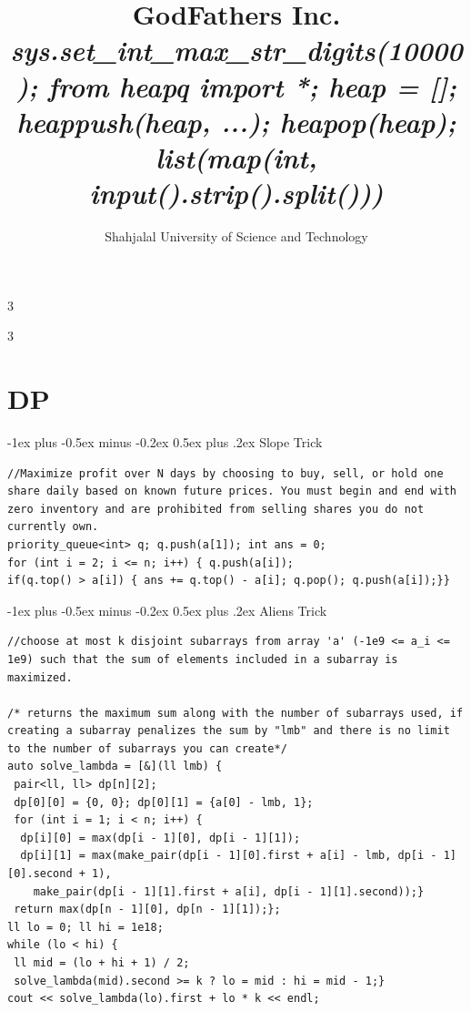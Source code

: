 \documentclass[8pt,a4paper,onesided]{article}
\makeatletter
\renewcommand{\subsection}{\@startsection{subsection}{2}{0mm}
    {-1ex plus -0.5ex minus -0.2ex} %
    {0.5ex plus .2ex}                %
    {\normalfont\large\bfseries}}    %
\makeatother
\begin{document}
\title{\vspace{-1.5cm}GodFathers Inc. \\ \large \textit{sys.set\_int\_max\_str\_digits(10000); from heapq import *; heap = []; heappush(heap, ...); heapop(heap); } \\ \large \textit{list(map(int, input().strip().split()))} }
\author{Shahjalal University of Science and Technology}
\date{}
\maketitle
\begin{multicols}{3}
\tableofcontents
\end{multicols}
\vspace{0.5cm}
\begin{multicols}{3}
\section{DP}
\subsection{Slope Trick}
\begin{verbatim}
//Maximize profit over N days by choosing to buy, sell, or hold one share daily based on known future prices. You must begin and end with zero inventory and are prohibited from selling shares you do not currently own.
priority_queue<int> q; q.push(a[1]); int ans = 0;
for (int i = 2; i <= n; i++) { q.push(a[i]);
if(q.top() > a[i]) { ans += q.top() - a[i]; q.pop(); q.push(a[i]);}}
\end{verbatim}
\subsection{Aliens Trick}
\begin{verbatim}
//choose at most k disjoint subarrays from array 'a' (-1e9 <= a_i <= 1e9) such that the sum of elements included in a subarray is maximized.

/* returns the maximum sum along with the number of subarrays used, if creating a subarray penalizes the sum by "lmb" and there is no limit to the number of subarrays you can create*/
auto solve_lambda = [&](ll lmb) {
 pair<ll, ll> dp[n][2];
 dp[0][0] = {0, 0}; dp[0][1] = {a[0] - lmb, 1};
 for (int i = 1; i < n; i++) {
  dp[i][0] = max(dp[i - 1][0], dp[i - 1][1]);
  dp[i][1] = max(make_pair(dp[i - 1][0].first + a[i] - lmb, dp[i - 1][0].second + 1),
    make_pair(dp[i - 1][1].first + a[i], dp[i - 1][1].second));}
 return max(dp[n - 1][0], dp[n - 1][1]);};
ll lo = 0; ll hi = 1e18;
while (lo < hi) {
 ll mid = (lo + hi + 1) / 2;
 solve_lambda(mid).second >= k ? lo = mid : hi = mid - 1;}
cout << solve_lambda(lo).first + lo * k << endl;
\end{verbatim}

\end{multicols}
\end{document}
